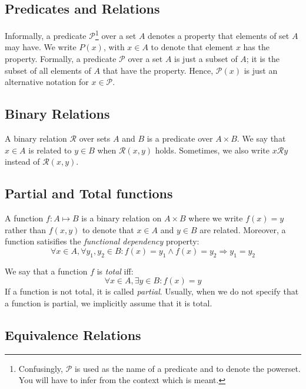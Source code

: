 \subsection*{Predicates and Relations}

Informally, a predicate $\mathcal{P}$\footnote{Confusingly, $\mathcal{P}$ is
used as the name of a predicate and to denote the powerset. You will have to
infer from the context which is meant.} over a set $A$ denotes a property that
elements of set $A$ may have. We write $P(x)$, with $x \in A$ to denote that
element $x$ has the property. Formally, a predicate $\mathcal{P}$ over a set
$A$ is just a subset of $A$; it is the subset of all elements of $A$ that have
the property. Hence, $\mathcal{P}(x)$ is just an alternative notation for $x \in \mathcal{P}$.

\subsection*{Binary Relations}

A binary relation $\mathcal{R}$ over sets $A$ and $B$ is a predicate over $A
\times B$. We say that $x \in A$ is related to $y \in B$ when
$\mathcal{R}(x,y)$ holds. Sometimes, we also write $x\mathcal{R}y$ instead of
$\mathcal{R}(x,y)$.

\subsection*{Partial and Total functions}

A function $f: A \mapsto B$ is a binary relation on $A \times B$ where
we write $f(x) = y$ rather than $f(x,y)$ to denote that $x \in A$ and $y \in B$
are related. Moreover, a function satisifies the \emph{functional dependency}
property:
\[ \forall x \in A, \forall y_1, y_2 \in B: f(x) = y_1 \wedge f(x) = y_2 \Rightarrow y_1 = y_2 \]

We say that a function $f$ is \emph{total} iff:
\[ \forall x \in A, \exists y \in B: f(x) = y \]
If a function is not total, it is called \emph{partial}. Usually, when we do
not specify that a function is partial, we implicitly assume that it is total.

\subsection*{Equivalence Relations}

